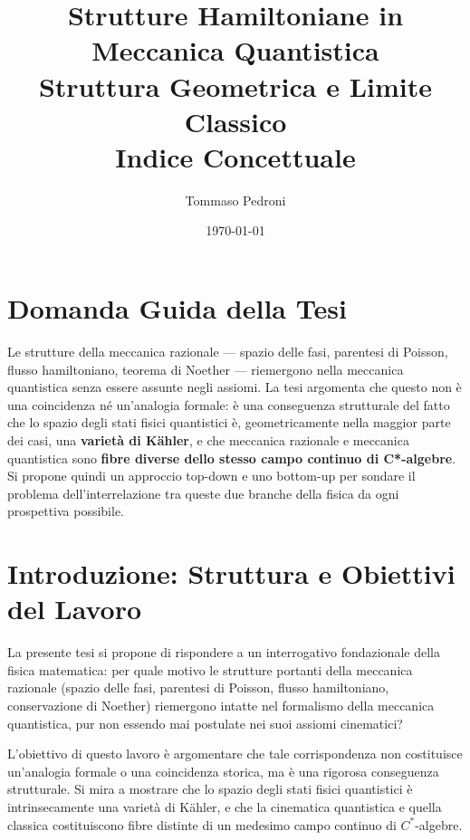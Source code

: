 \documentclass[12pt, a4paper]{article}
\title{%
	\textbf{Strutture Hamiltoniane in Meccanica Quantistica}\\[6pt]
	\large Struttura Geometrica e Limite Classico\\[4pt]
	\normalsize Indice Concettuale
}
\author{Tommaso Pedroni}
\date{\today}
\begin{document}
	
	\maketitle
	\tableofcontents
	\newpage
	
	\section*{Domanda Guida della Tesi}
	
	Le strutture della meccanica razionale --- spazio delle fasi, parentesi di Poisson, flusso hamiltoniano, teorema di Noether --- riemergono nella meccanica quantistica senza essere assunte negli assiomi. La tesi argomenta che questo non è una coincidenza né un'analogia formale: è una conseguenza strutturale del fatto che lo spazio degli stati fisici quantistici è, geometricamente nella maggior parte dei casi, una \textbf{varietà di Kähler}, e che meccanica razionale e meccanica quantistica sono \textbf{fibre diverse dello stesso campo continuo di C*-algebre}. Si propone quindi un approccio top-down e uno bottom-up per sondare il problema dell'interrelazione tra queste due branche della fisica da ogni prospettiva possibile.
	
	\newpage
	\section*{Introduzione: Struttura e Obiettivi del Lavoro}
	
	La presente tesi si propone di rispondere a un interrogativo fondazionale della fisica matematica: per quale motivo le strutture portanti della meccanica razionale (spazio delle fasi, parentesi di Poisson, flusso hamiltoniano, conservazione di Noether) riemergono intatte nel formalismo della meccanica quantistica, pur non essendo mai postulate nei suoi assiomi cinematici?
	
	L'obiettivo di questo lavoro è argomentare che tale corrispondenza non costituisce un'analogia formale o una coincidenza storica, ma è una rigorosa conseguenza strutturale. Si mira a mostrare che lo spazio degli stati fisici quantistici è intrinsecamente una varietà di Kähler, e che la cinematica quantistica e quella classica costituiscono fibre distinte di un medesimo campo continuo di $C^*$-algebre. 
	
\end{document}
